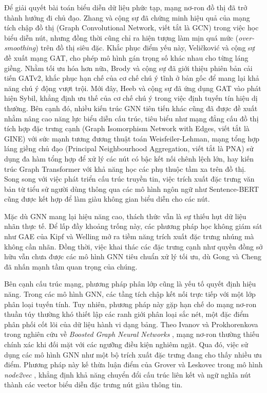 Để giải quyết bài toán biểu diễn dữ liệu phức tạp, mạng nơ-ron đồ thị đã trở thành hướng đi chủ đạo. Zhang và cộng sự \cite{zhang2019graph} đã chứng minh hiệu quả của mạng tích chập đồ thị (Graph Convolutional Network, viết tắt là GCN) trong việc học biểu diễn nút, nhưng đồng thời cũng chỉ ra hiện tượng làm mịn quá mức (\textit{over-smoothing}) trên đồ thị siêu đặc. Khắc phục điểm yếu này, Veličković và cộng sự \cite{velickovic2017graph} đề xuất mạng GAT, cho phép mô hình gán trọng số khác nhau cho từng láng giềng. Nhằm tối ưu hóa hơn nữa, Brody và cộng sự \cite{brody2021attentive} đã giới thiệu phiên bản cải tiến GATv2, khắc phục hạn chế của cơ chế chú ý tĩnh ở bản gốc để mang lại khả năng chú ý động vượt trội. Mới đây, Heeb và cộng sự \cite{heeb2024sybil} đã ứng dụng GAT vào phát hiện Sybil, khẳng định ưu thế của cơ chế chú ý trong việc định tuyến tín hiệu dị thường. Bên cạnh đó, nhiều kiến trúc GNN tiên tiến khác cũng đã được đề xuất nhằm nâng cao năng lực biểu diễn cấu trúc, tiêu biểu như mạng đẳng cấu đồ thị tích hợp đặc trưng cạnh (Graph Isomorphism Network with Edges, viết tắt là GINE) \cite{xu2018powerful} với sức mạnh tương đương thuật toán Weisfeiler-Lehman, mạng tổng hợp láng giềng chủ đạo (Principal Neighbourhood Aggregation, viết tắt là PNA) \cite{corso2020principal} sử dụng đa hàm tổng hợp để xử lý các nút có bậc kết nối chênh lệch lớn, hay kiến trúc Graph Transformer \cite{yun2019graph} với khả năng học các phụ thuộc tầm xa trên đồ thị. Song song với việc phát triển cấu trúc truyền tin, việc trích xuất đặc trưng văn bản từ tiểu sử người dùng thông qua các mô hình ngôn ngữ như Sentence-BERT \cite{reimers2019sentence} cũng được kết hợp để làm giàu không gian biểu diễn cho các nút.\vspace{0.3cm}

Mặc dù GNN mang lại hiệu năng cao, thách thức vẫn là sự thiếu hụt dữ liệu nhãn thực tế. Để lấp đầy khoảng trống này, các phương pháp học không giám sát như GAE của Kipf và Welling \cite{kipf2016variational} mở ra tiềm năng trích xuất đặc trưng nhúng mà không cần nhãn. Đồng thời, việc khai thác các đặc trưng cạnh như quyền đồng sở hữu vẫn chưa được các mô hình GNN tiêu chuẩn xử lý tối ưu, dù Gong và Cheng \cite{gong2019exploiting} đã nhấn mạnh tầm quan trọng của chúng.\vspace{0.3cm}

Bên cạnh cấu trúc mạng, phương pháp phân lớp cũng là yếu tố quyết định hiệu năng. Trong các mô hình GNN, các tầng tích chập kết nối trực tiếp với một lớp phân loại tuyến tính. Tuy nhiên, phương pháp này gặp hạn chế do mạng nơ-ron thuần túy thường khó thiết lập các ranh giới phân loại sắc nét, một đặc điểm phân phối cốt lõi của dữ liệu hành vi dạng bảng. Theo Ivanov và Prokhorenkova trong nghiên cứu về \textit{Boosted Graph Neural Networks} \cite{ivanov2021boosted}, mạng nơ-ron thường thiếu chính xác khi đối mặt với các ngưỡng điều kiện nghiêm ngặt. Qua đó, việc sử dụng các mô hình GNN như một bộ trích xuất đặc trưng đang cho thấy nhiều ưu điểm. Phương pháp này kế thừa luận điểm của Grover và Leskovec trong mô hình \textit{node2vec} \cite{grover2016node2vec}, khẳng định khả năng chuyển đổi cấu trúc liên kết và ngữ nghĩa nút thành các vector biểu diễn đặc trưng nút giàu thông tin.\vspace{0.3cm}

